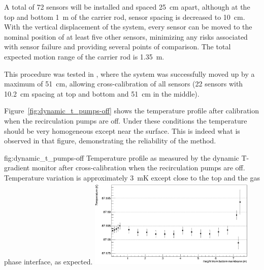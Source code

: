 A total of \num{72} sensors will be installed and spaced \SI{25}{cm} apart, although at the top and bottom \SI{1}{m} of the carrier rod, sensor spacing is decreased to \SI{10}{cm}.  
 With the vertical displacement of the system, every sensor can be moved to the nominal position of at least five other sensors, minimizing any risks associated with sensor failure and providing several points of comparison. The total expected motion range of the carrier rod is \SI{1.35}{m}.


This procedure was tested in , where the system was successfully moved up by a maximum of \SI{51}{cm}, allowing cross-calibration of all sensors (22 sensors with \SI{10.2}{cm} spacing at top and bottom and \SI{51}{cm} in the middle). 


Figure~\ref{fig:dynamic_t_pumps-off} shows the temperature profile after calibration when the recirculation pumps are off. Under these conditions the  temperature should be very homogeneous except near the surface. This is indeed what is observed in that figure, demonstrating the reliability of the method.  

\begin{dunefigure}{fig:dynamic_t_pumps-off}
  {Temperature profile as measured by the dynamic T-gradient monitor after cross-calibration when the recirculation pumps are off. Temperature variation is approximately \SI{3}{mK} except close to the top and the gas phase interface, as expected.}
  \includegraphics[width=0.6\textwidth]{graphics/cisc_dynamic_t_pumps-off.png}%
\end{dunefigure}




